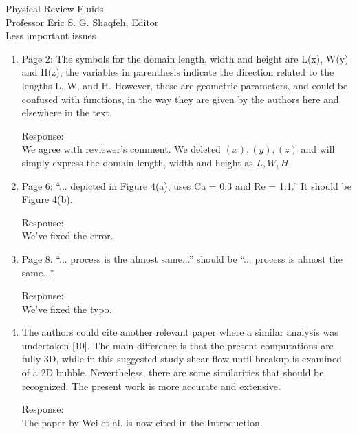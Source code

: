 \documentclass{letter}
\begin{document}
\begin{letter}{
Physical Review Fluids\\
Professor Eric S. G. Shaqfeh, Editor\\}
Less important issues
\begin{enumerate}

\item
\textsf
{Page 2: The symbols for the domain length, width and height are L(x), W(y) and H(z), the variables in parenthesis indicate the direction related 
to the lengths L, W, and H. However, these are geometric parameters, and could be confused with functions, in the way they are given by the 
authors here and elsewhere in the text.\\
}
\vspace{5 mm}

Response: \\
We agree with reviewer's comment. We deleted $(x), (y), (z)$ and will simply
express the domain length, width and height as $L, W, H$.\\

\par\noindent
\item
\textsf
{Page 6: “... depicted in Figure 4(a), uses Ca = 0:3 and Re = 1:1.” It should be Figure 4(b).\\
}
\vspace{5 mm}

Response: \\
We've fixed the error.\\

\par\noindent
\item
\textsf
{Page 8: “... process is the almost same...” should be “... process is almost the same...”.\\
}
\vspace{5 mm}

Response: \\
We've fixed the typo.\\

\par\noindent
\item
\textsf
{The authors could cite another relevant paper where a similar analysis was undertaken [10]. 
The main difference is that the present computations are fully 3D, while in this suggested study shear 
flow until breakup is examined of a 2D bubble. Nevertheless, there are some similarities 
that should be recognized. The present work is more accurate and extensive.\\
}
\vspace{5 mm}

Response: \\
The paper by Wei et al. is now cited in the Introduction.\\


\end{enumerate}
\end{letter}
\end{document}

